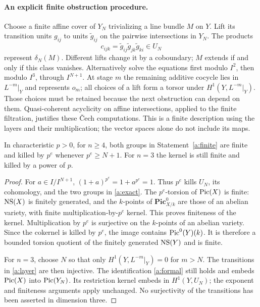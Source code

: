 \paragraph{An explicit finite obstruction procedure.}
Choose a finite affine cover of $Y_N$ trivializing a line bundle $M$ on
$Y$.  Lift its transition units $g_{ij}$ to units $\widetilde g_{ij}$ on
the pairwise intersections in $Y_N$.  The products
\[
 c_{ijk}=\widetilde g_{ij}\widetilde g_{jk}\widetilde g_{ki}\in U_N
\]
represent $\delta_N(M)$.  Different lifts change it by a coboundary;
$M$ extends if and only if this class vanishes.  Alternatively solve the
equations first modulo $I^2$, then modulo $I^3$, through $I^{N+1}$.
At stage $m$ the remaining additive cocycle lies in $L^{-m}|_Y$ and
represents $o_m$; all choices of a lift form a torsor under
$H^1(Y,L^{-m}|_Y)$.  Those choices must be retained because the next
obstruction can depend on them.  Quasi-coherent acyclicity on affine
intersections, applied to the finite filtration, justifies these
\v Cech computations.  This is a finite description using the layers and
their multiplication; the vector spaces alone do not include its maps.

\begin{corollary}\label{a:pgroups}
In characteristic $p>0$, for $n\geq4$, both groups in
Statement~\ref{a:finite} are finite and killed by $p^e$ whenever
$p^e\geq N+1$.  For $n=3$ the kernel is still finite and killed by a
power of $p$.
\end{corollary}
\begin{proof}
For $a\in I/I^{N+1}$, $(1+a)^{p^e}=1+a^{p^e}=1$.  Thus $p^e$ kills
$U_N$, its cohomology, and the two groups in \eqref{a:exact}.
The $p^e$-torsion of $\operatorname{Pic}(X)$ is finite: $\operatorname{NS}(X)$ is finitely generated,
and the $k$-points of $\mathbf{Pic}^0_{X/k}$ are those of an abelian
variety, with finite multiplication-by-$p^e$ kernel.  This proves
finiteness of the kernel.  Multiplication by $p^e$ is surjective on the
$k$-points of an abelian variety.  Since the cokernel is killed by $p^e$,
the image contains $\operatorname{Pic}^0(Y)(k)$.  It is therefore a bounded torsion
quotient of the finitely generated $\operatorname{NS}(Y)$ and is finite.

For $n=3$, choose $N$ so that only $H^1(Y,L^{-m}|_Y)=0$ for $m>N$.
The transitions in \eqref{a:layer} are then injective.
The identification \eqref{a:formal} still holds and embeds $\operatorname{Pic}(X)$
into $\operatorname{Pic}(Y_N)$.  Its restriction kernel embeds in $H^1(Y,U_N)$;
the exponent and finiteness arguments apply unchanged.  No surjectivity
of the transitions has been asserted in dimension three.
\end{proof}

